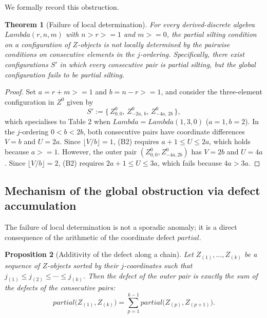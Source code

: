 \documentclass[11pt, a4paper]{article}
\newtheorem{theorem}{Theorem}[section]
\newtheorem{proposition}[theorem]{Proposition}
\theoremstyle{definition}
\def\Lambda{Lambda}%
\def\partial{partial}%
\def\ge{>=}%
\def\mathcal#1{#1}%
\begin{document}
We formally record this obstruction.

\begin{theorem}[Failure of local determination]\label{thm:notlocal}
For every derived-discrete algebra $\Lambda(r,n,m)$ with $n > r \ge 1$ and $m \ge 0$, the partial silting condition on a configuration of $\mathcal Z$-objects is not locally determined by the pairwise conditions on consecutive elements in the $j$-ordering. Specifically, there exist configurations $S'$ in which every consecutive pair is partial silting, but the global configuration fails to be partial silting.
\end{theorem}

\begin{proof}
Set $a = r+m \ge 1$ and $b = n-r \ge 1$, and consider the three-element configuration in $\mathcal Z^0$ given by
\[
S' := \bigl\{\, Z_{0,0}^0,\, Z_{-2a,\, b}^0,\, Z_{-4a,\, 2b}^0 \,\bigr\},
\]
which specialises to Table 2 when $\Lambda = \Lambda(1,3,0)$ ($a=1, b=2$). In the $j$-ordering $0 < b < 2b$, both consecutive pairs have coordinate differences $V = b$ and $U = 2a$. Since $\lfloor V/b \rfloor = 1$, \textup{(B2)} requires $a + 1 \le U \le 2a$, which holds because $a \ge 1$. However, the outer pair $(Z_{0,0}^0, Z_{-4a, 2b}^0)$ has $V = 2b$ and $U = 4a$. Since $\lfloor V/b \rfloor = 2$, \textup{(B2)} requires $2a + 1 \le U \le 3a$, which fails because $4a > 3a$.
\end{proof}
\subsection{Mechanism of the global obstruction via defect accumulation}
\label{subsec:notlocal-mechanism}

The failure of local determination is not a sporadic anomaly; it is a direct consequence of the arithmetic of the coordinate defect $\partial$.

\begin{proposition}[Additivity of the defect along a chain]\label{prop:defect-additive}
Let $Z_{(1)}, \ldots, Z_{(k)}$ be a sequence of $\mathcal Z$-objects sorted by their $j$-coordinates such that $j_{(1)} \le j_{(2)} \le \cdots \le j_{(k)}$. Then the defect of the outer pair is exactly the sum of the defects of the consecutive pairs:
\[
  \partial\bigl(Z_{(1)}, Z_{(k)}\bigr) = \sum_{p=1}^{k-1} \partial\bigl(Z_{(p)}, Z_{(p+1)}\bigr).
\]
\end{proposition}
\end{document}
